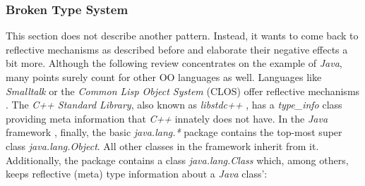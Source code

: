 %
%
%
%
%
%
%

\subsubsection{Broken Type System}
\label{broken_type_system_heading}

This section does not describe another pattern. Instead, it wants to come back
to reflective mechanisms as described before and elaborate their negative
effects a bit more. Although the following review concentrates on the example
of \emph{Java}, many points surely count for other OO languages as well.
Languages like \emph{Smalltalk} or the \emph{Common Lisp Object System} (CLOS)
offer reflective mechanisms \cite{buschmann}. The \emph{C++ Standard Library},
also known as \emph{libstdc++} \cite{libstdcpp}, has a \emph{type\_info} class
providing meta information that \emph{C++} innately does not have. In the
\emph{Java} framework \cite{java}, finally, the basic \emph{java.lang.*}
package contains the top-most super class \emph{java.lang.Object}. All other
classes in the framework inherit from it. Additionally, the package contains a
class \emph{java.lang.Class} which, among others, keeps reflective (meta) type
information about a \emph{Java} class':

